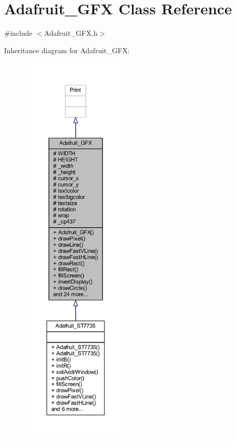 \hypertarget{class_adafruit___g_f_x}{}\section{Adafruit\+\_\+\+G\+FX Class Reference}
\label{class_adafruit___g_f_x}


{\ttfamily \#include $<$Adafruit\+\_\+\+G\+F\+X.\+h$>$}



Inheritance diagram for Adafruit\+\_\+\+G\+FX\+:\nopagebreak
\begin{figure}[H]
\begin{center}
\leavevmode
\includegraphics[height=550pt]{class_adafruit___g_f_x__inherit__graph}
\end{center}
\end{figure}


